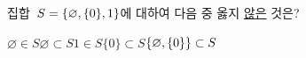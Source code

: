 집합~$S=\{\varnothing{,}\mkern3mu\mathopen{}\{0\}{,}\mkern3mu\mathopen{}1\}$에 대하여 다음 중 옳지 \underline{않은} 것은?
\begin{choices32}{$\varnothing\in S$}{$\varnothing\subset S$}{$1\in S$}{$\{0\}\subset S$}{$\{\varnothing{,}\mkern3mu\mathopen{}\{0\}\}\subset S$}\end{choices32}
